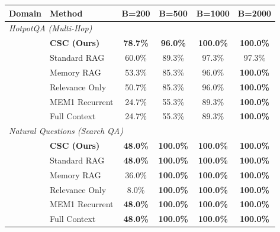 \begin{table}[t]
\centering
\small
\begin{tabular}{llcccc}
\toprule
\textbf{Domain} & \textbf{Method} & \textbf{B=200} & \textbf{B=500} & \textbf{B=1000} & \textbf{B=2000} \\
\midrule
\multicolumn{6}{l}{\textit{HotpotQA (Multi-Hop)}} \\[2pt]
\hspace{3mm} & \textbf{CSC (Ours)} & \textbf{78.7\%} & \textbf{96.0\%} & \textbf{100.0\%} & \textbf{100.0\%} \\
\hspace{3mm} & Standard RAG & 60.0\% & 89.3\% & 97.3\% & 97.3\% \\
\hspace{3mm} & Memory RAG & 53.3\% & 85.3\% & 96.0\% & \textbf{100.0\%} \\
\hspace{3mm} & Relevance Only & 50.7\% & 85.3\% & 96.0\% & \textbf{100.0\%} \\
\hspace{3mm} & MEM1 Recurrent & 24.7\% & 55.3\% & 89.3\% & \textbf{100.0\%} \\
\hspace{3mm} & Full Context & 24.7\% & 55.3\% & 89.3\% & \textbf{100.0\%} \\
\midrule
\multicolumn{6}{l}{\textit{Natural Questions (Search QA)}} \\[2pt]
\hspace{3mm} & \textbf{CSC (Ours)} & \textbf{48.0\%} & \textbf{100.0\%} & \textbf{100.0\%} & \textbf{100.0\%} \\
\hspace{3mm} & Standard RAG & \textbf{48.0\%} & \textbf{100.0\%} & \textbf{100.0\%} & \textbf{100.0\%} \\
\hspace{3mm} & Memory RAG & 36.0\% & \textbf{100.0\%} & \textbf{100.0\%} & \textbf{100.0\%} \\
\hspace{3mm} & Relevance Only & 8.0\% & \textbf{100.0\%} & \textbf{100.0\%} & \textbf{100.0\%} \\
\hspace{3mm} & MEM1 Recurrent & \textbf{48.0\%} & \textbf{100.0\%} & \textbf{100.0\%} & \textbf{100.0\%} \\
\hspace{3mm} & Full Context & \textbf{48.0\%} & \textbf{100.0\%} & \textbf{100.0\%} & \textbf{100.0\%} \\

\end{tabular}
\end{table}
